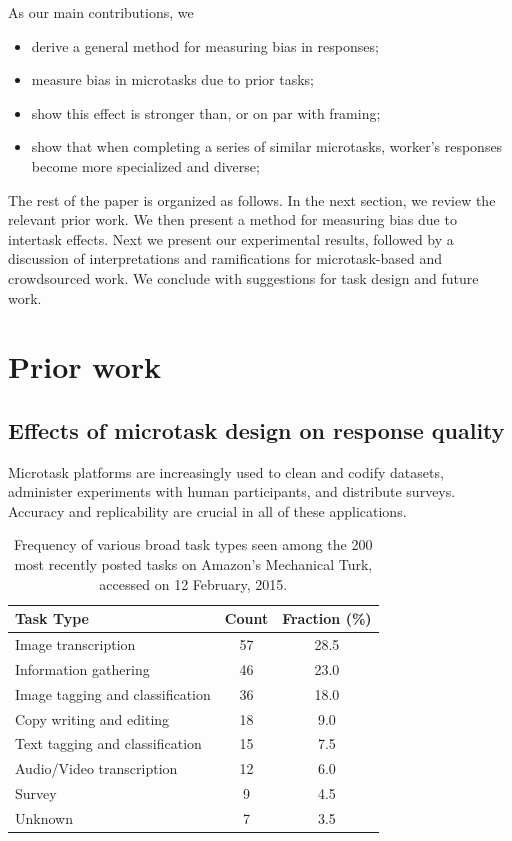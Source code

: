 \documentclass{sigchi}
\begin{document}
As our main contributions, we
\begin{itemize}[noitemsep,nolistsep]
  \item{derive a general method for measuring bias in responses;}
  \item{measure bias in microtasks due to prior tasks;}
  \item{show this effect is stronger than, or on par with framing;}
  \item{
	show that when completing a series of similar microtasks,
	worker's responses become more specialized and diverse;
  }
\end{itemize}

The rest of the paper is organized as follows.  In the next section, we 
review the relevant prior work.  We then present a method for 
measuring bias due to intertask effects.  
Next we present our experimental results, followed by a discussion 
of interpretations and ramifications for microtask-based and crowdsourced 
work.  We conclude with suggestions for task design and future work.

\section{Prior work}
\subsection{Effects of microtask design on response quality}
Microtask platforms are increasingly used to clean and codify datasets,
administer experiments with human participants, and distribute 
surveys.  Accuracy and replicability are crucial in all of these 
applications.

\begin{table}
\centering
\begin{tabular}{l c c}
\toprule
Task Type & Count & Fraction (\%) \\
\toprule
Image transcription & 57 & 28.5 \\
Information gathering & 46 & 23.0 \\
Image tagging and classification & 36 & 18.0 \\
Copy writing and editing & 18 & 9.0 \\
Text tagging and classification & 15 & 7.5 \\
Audio/Video transcription & 12 & 6.0 \\
Survey & 9 & 4.5 \\
Unknown & 7 & 3.5 \\
\bottomrule
\end{tabular}
\caption{
	Frequency of various broad task types seen among the 200 most 
	recently posted tasks on Amazon's Mechanical Turk, 
	accessed on 12 February, 2015.
}
\label{table:task_composition}
\end{table}
\end{document}
